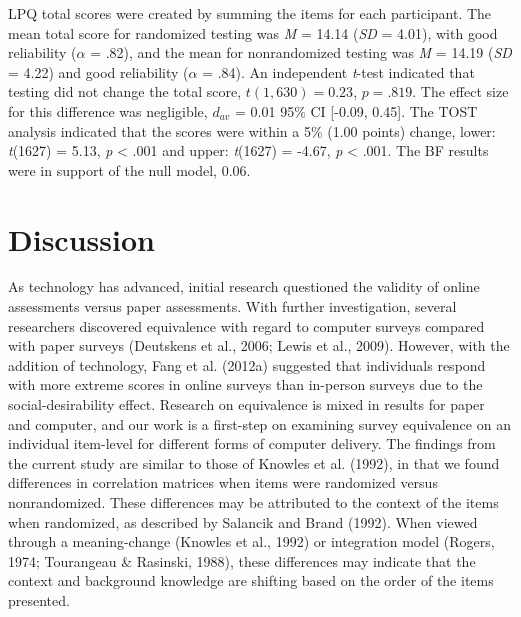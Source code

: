 \documentclass[english,man]{apa6}
\theoremstyle{definition}
\theoremstyle{definition}
\theoremstyle{definition}
\theoremstyle{remark}
\begin{document}
LPQ total scores were created by summing the items for each participant.
The mean total score for randomized testing was \emph{M} = 14.14
(\emph{SD} = 4.01), with good reliability (\(\alpha\) = .82), and the
mean for nonrandomized testing was \emph{M} = 14.19 (\emph{SD} = 4.22)
and good reliability (\(\alpha\) = .84). An independent \emph{t}-test
indicated that testing did not change the total score,
\(t(1,630) = 0.23\), \(p = .819\). The effect size for this difference
was negligible, \(d_{av}\) = 0.01 95\% CI {[}-0.09, 0.45{]}. The TOST
analysis indicated that the scores were within a 5\% (1.00 points)
change, lower: \emph{t}(1627) = 5.13, \emph{p} \textless{} .001 and
upper: \emph{t}(1627) = -4.67, \emph{p} \textless{} .001. The BF results
were in support of the null model, 0.06.

\section{Discussion}\label{discussion}

As technology has advanced, initial research questioned the validity of
online assessments versus paper assessments. With further investigation,
several researchers discovered equivalence with regard to computer
surveys compared with paper surveys (Deutskens et al., 2006; Lewis et
al., 2009). However, with the addition of technology, Fang et al.
(2012a) suggested that individuals respond with more extreme scores in
online surveys than in-person surveys due to the social-desirability
effect. Research on equivalence is mixed in results for paper and
computer, and our work is a first-step on examining survey equivalence
on an individual item-level for different forms of computer delivery.
The findings from the current study are similar to those of Knowles et
al. (1992), in that we found differences in correlation matrices when
items were randomized versus nonrandomized. These differences may be
attributed to the context of the items when randomized, as described by
Salancik and Brand (1992). When viewed through a meaning-change (Knowles
et al., 1992) or integration model (Rogers, 1974; Tourangeau \&
Rasinski, 1988), these differences may indicate that the context and
background knowledge are shifting based on the order of the items
presented.
\end{document}
